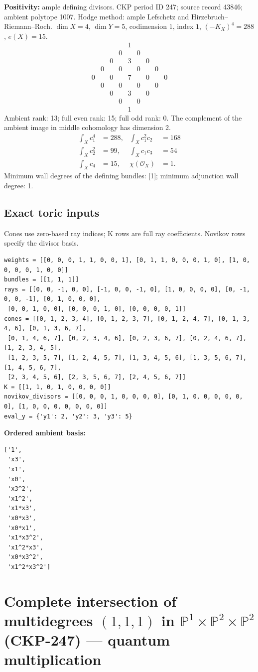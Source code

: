 \documentclass[10pt,a4paper]{article}
\newcommand{\hodge}[4]{\begin{array}{ccccccccc}
&&&&1&&&&\\&&&0&&0&&&\\&&0&&#1&&0&&\\&0&&#2&&#2&&0&\\
0&&#3&&#4&&#3&&0\\&0&&#2&&#2&&0&\\&&0&&#1&&0&&\\&&&0&&0&&&\\&&&&1&&&&\end{array}}
\begin{document}
\textbf{Positivity:} ample defining divisors.
CKP period ID 247; source record 43846; ambient polytope 1007.
Hodge method: ample Lefschetz and Hirzebruch--Riemann--Roch.
$\dim X=4$, $\dim Y=5$, codimension $1$, index $1$, $(-K_X)^4=288$, $e(X)=15$.
\[\hodge{3}{0}{0}{7}\]
Ambient rank: 13; full even rank: 15; full odd rank: 0. The complement of the ambient image in middle cohomology has dimension 2.
\[\begin{aligned}\int_Xc_1^4&=288,&\int_Xc_1^2c_2&=168\\\int_Xc_2^2&=99,&\int_Xc_1c_3&=54\\\int_Xc_4&=15,&\chi(\mathcal O_X)&=1.\end{aligned}\]
Minimum wall degrees of the defining bundles: [1]; minimum adjunction wall degree: 1.
\subsection*{Exact toric inputs}
Cones use zero-based ray indices; K rows are full ray coefficients. Novikov rows specify the divisor basis.

\begin{lstlisting}
weights = [[0, 0, 0, 1, 1, 0, 0, 1], [0, 1, 1, 0, 0, 0, 1, 0], [1, 0, 0, 0, 0, 1, 0, 0]]
bundles = [[1, 1, 1]]
rays = [[0, 0, -1, 0, 0], [-1, 0, 0, -1, 0], [1, 0, 0, 0, 0], [0, -1, 0, 0, -1], [0, 1, 0, 0, 0],
 [0, 0, 1, 0, 0], [0, 0, 0, 1, 0], [0, 0, 0, 0, 1]]
cones = [[0, 1, 2, 3, 4], [0, 1, 2, 3, 7], [0, 1, 2, 4, 7], [0, 1, 3, 4, 6], [0, 1, 3, 6, 7],
 [0, 1, 4, 6, 7], [0, 2, 3, 4, 6], [0, 2, 3, 6, 7], [0, 2, 4, 6, 7], [1, 2, 3, 4, 5],
 [1, 2, 3, 5, 7], [1, 2, 4, 5, 7], [1, 3, 4, 5, 6], [1, 3, 5, 6, 7], [1, 4, 5, 6, 7],
 [2, 3, 4, 5, 6], [2, 3, 5, 6, 7], [2, 4, 5, 6, 7]]
K = [[1, 1, 0, 1, 0, 0, 0, 0]]
novikov_divisors = [[0, 0, 0, 1, 0, 0, 0, 0], [0, 1, 0, 0, 0, 0, 0, 0], [1, 0, 0, 0, 0, 0, 0, 0]]
eval_y = {'y1': 2, 'y2': 3, 'y3': 5}
\end{lstlisting}

\textbf{Ordered ambient basis:}
\begin{lstlisting}
['1',
 'x3',
 'x1',
 'x0',
 'x3^2',
 'x1^2',
 'x1*x3',
 'x0*x3',
 'x0*x1',
 'x1*x3^2',
 'x1^2*x3',
 'x0*x3^2',
 'x1^2*x3^2']
\end{lstlisting}

\clearpage\section*{Complete intersection of multidegrees $(1,1,1)$ in $\mathbb P^{1}\times \mathbb P^{2}\times \mathbb P^{2}$ (CKP-247) --- quantum multiplication}
\end{document}
